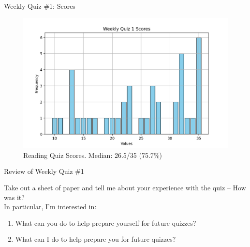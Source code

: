 \documentclass[10pt]{beamer}
\begin{document}
\begin{frame}{Weekly Quiz \#1: Scores}

\begin{figure}[ht]
        \centering
        \includegraphics[width=\textwidth]{images/quiz1_scores}
        \caption{Reading Quiz Scores. Median: 26.5/35 (75.7\%)}
\end{figure}
\vfill 

\end{frame}


\begin{frame}{Review of Weekly Quiz \#1}

\begin{myredbox}[title=Reflections ($\approx$ 3 min)]
Take out a sheet of paper and tell me about your experience with the quiz -- How was it? \\

In particular, I'm interested in:
\begin{enumerate}
\item What can you do to help prepare yourself for future quizzes?	
\item What can I do to help prepare you for future quizzes?
\end{enumerate}
\end{myredbox}
			
\end{frame}
\end{document}
